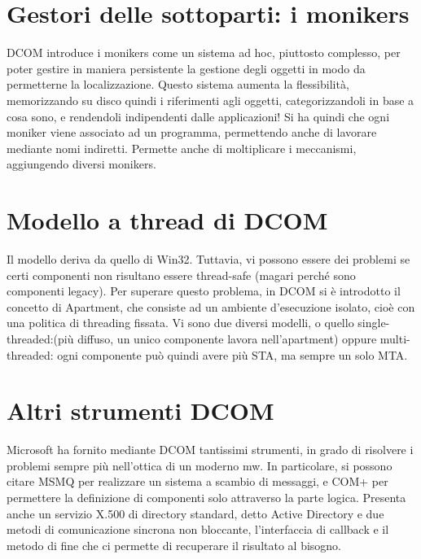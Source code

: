 \section{Gestori delle sottoparti: i monikers}
DCOM introduce i monikers come un sistema ad hoc, piuttosto complesso, per poter gestire in maniera persistente la
gestione degli oggetti in modo da permetterne la localizzazione. Questo sistema aumenta la flessibilità, memorizzando su disco quindi i riferimenti agli oggetti,
categorizzandoli in base a cosa sono, e rendendoli indipendenti dalle applicazioni!
Si ha quindi che ogni moniker viene associato ad un programma, permettendo anche di lavorare mediante nomi indiretti.
Permette anche di moltiplicare i meccanismi, aggiungendo diversi monikers.
\section{Modello a thread di DCOM}
Il modello deriva da quello di Win32. Tuttavia, vi possono essere dei problemi se certi componenti non risultano essere
thread-safe (magari perché sono componenti legacy). Per superare questo problema, in DCOM si è introdotto il concetto di
Apartment, che consiste ad un ambiente d'esecuzione isolato, cioè con una politica di threading fissata. Vi sono due
diversi modelli, o quello single-threaded:(più diffuso, un unico componente lavora nell'apartment) oppure
multi-threaded: ogni componente può quindi avere più STA, ma sempre un solo MTA.
\section{Altri strumenti DCOM}
Microsoft ha fornito mediante DCOM tantissimi strumenti, in grado di risolvere
i problemi sempre più nell'ottica di un moderno mw.
In particolare, si possono citare MSMQ per realizzare un sistema a scambio di
messaggi, e COM+ per permettere la definizione di componenti solo attraverso
la parte logica. Presenta anche un servizio X.500 di directory standard, detto
Active Directory e due metodi di comunicazione sincrona non bloccante,
l'interfaccia di callback e il metodo di fine che ci permette di recuperare il
risultato al bisogno.

